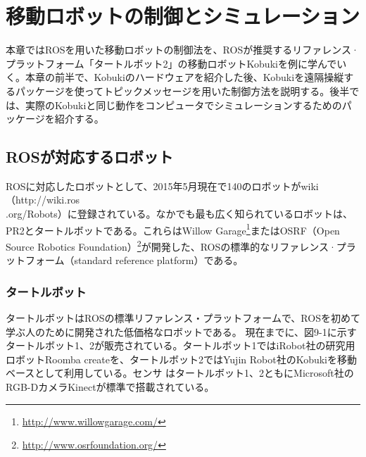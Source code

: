 
\chapter{移動ロボットの制御とシミュレーション}

本章ではROSを用いた移動ロボットの制御法を、ROSが推奨するリファレンス·プラットフォーム「タートルボット2」の移動ロボットKobukiを例に学んでいく。本章の前半で、Kobukiのハードウェアを紹介した後、Kobukiを遠隔操縦するパッケージを使ってトピックメッセージを用いた制御方法を説明する。後半では、実際のKobukiと同じ動作をコンピュータでシミュレーションするためのパッケージを紹介する。

\section{ROSが対応するロボット}

ROSに対応したロボットとして、2015年5月現在で140のロボットがwiki（http://wiki.ros\\.org/Robots）に登録されている。なかでも最も広く知られているロボットは、PR2とタートルボットである。これらはWillow Garage\footnote{\url{http://www.willowgarage.com/}}またはOSRF（Open Source Robotics Foundation）\footnote{\url{http://www.osrfoundation.org/}}が開発した、ROSの標準的なリファレンス·プラットフォーム（standard reference platform）である。

\subsection{タートルボット}

タートルボットはROSの標準リファレンス・プラットフォームで、ROSを初めて学ぶ人のために開発された低価格なロボットである。
現在までに、図9-1に示すタートルボット1、2が販売されている。タートルボット1ではiRobot社の研究用ロボットRoomba createを、タートルボット2ではYujin Robot社のKobukiを移動ベースとして利用している。センサ    はタートルボット1、2ともにMicrosoft社のRGB-DカメラKinectが標準で搭載されている。

